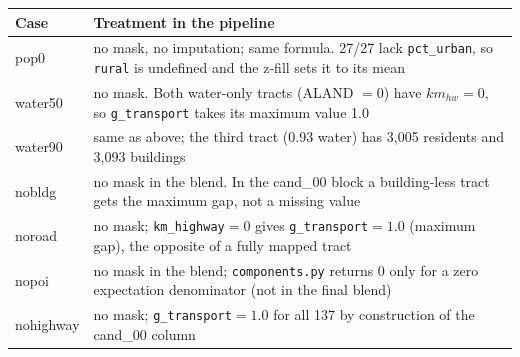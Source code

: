 \smallskip

\begin{tabular}{p{1.7cm}p{11.4cm}}
\toprule
Case & Treatment in the pipeline \\
\midrule
pop0 & no mask, no imputation; same formula. 27/27 lack \texttt{pct\_urban}, so \texttt{rural} is undefined and the z-fill sets it to its mean \\
water50 & no mask. Both water-only tracts (ALAND $=0$) have $km_{hw}=0$, so \texttt{g\_transport} takes its maximum value 1.0 \\
water90 & same as above; the third tract (0.93 water) has 3{,}005 residents and 3{,}093 buildings \\
nobldg & no mask in the blend. In the cand\_00 block a building-less tract gets the maximum gap, not a missing value \\
noroad & no mask; \texttt{km\_highway}$=0$ gives \texttt{g\_transport}$=1.0$ (maximum gap), the opposite of a fully mapped tract \\
nopoi & no mask in the blend; \texttt{components.py} returns 0 only for a zero expectation denominator (not in the final blend) \\
nohighway & no mask; \texttt{g\_transport}$=1.0$ for all 137 by construction of the cand\_00 column \\
\bottomrule
\end{tabular}